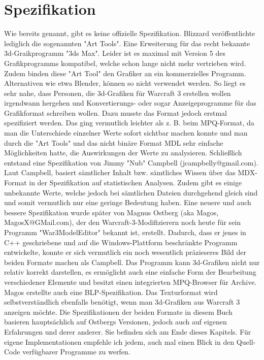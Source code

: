 \section{Spezifikation}
Wie bereits genannt, gibt es keine offizielle Spezifikation. Blizzard veröffentlichte lediglich die sogenannten "Art Tools".
Eine Erweiterung für das recht bekannte 3d-Graikprogramm "3ds Max". Leider ist es maximal mit Version 5 des Grafikprogramms kompatibel,
welche schon lange nicht mehr vertrieben wird.
Zudem binden diese "Art Tool" den Grafiker an ein kommerzielles Programm. Alternativen wie etwa Blender,
können so nicht verwendet werden.
So liegt es sehr nahe, dass Personen, die 3d-Grafiken für Warcraft 3 erstellen wollen irgendwann hergehen
und Konvertierungs- oder sogar Anzeigeprogramme für das Grafikformat schreiben wollen.
Dazu musste das Format jedoch erstmal spezifiziert werden. Das ging vermutlich leichter als z. B. beim MPQ-Format,
da man die Unterschiede einzelner Werte sofort sichtbar machen konnte und man durch die "Art Tools" und das
nicht binäre Format MDL sehr einfache Möglichkeiten hatte, die Auswirkungen der Werte zu analysieren.
Schließlich entstand eine Spezifikation von Jimmy "Nub" Campbell (jcampbelly@gmail.com).
Laut Campbell, basiert sämtlicher Inhalt bzw. sämtliches Wissen über das MDX-Format in der Spezifikation auf statistischen Analysen. Zudem gibt es einige unbekannte Werte, welche jedoch bei sämtlichen Dateien durchgehend gleich sind und somit vermutlich nur eine geringe Bedeutung haben.
Eine neuere und auch bessere Spezifikation wurde später von Magnus Ostberg (aka Magos, MagosX@GMail.com), der den Warcraft-3-Modifizierern
noch heute für sein Programm "War3ModelEditor" bekannt ist, erstellt.
Dadurch, dass er jenes in C++ geschriebene und auf die Windows-Plattform beschränkte Programm entwickelte,
konnte er sich vermutlich ein noch wesentlich präzieseres Bild der beiden Formate machen als Campbell.
Das Programm kann 3d-Grafiken nicht nur relativ korrekt darstellen, es ermöglicht auch eine einfache Form
der Bearbeitung verschiedener Elemente und besitzt einen integrierten MPQ-Browser für Archive.
Magos erstellte auch eine BLP-Spezifikation. Das Texturformat wird selbstverständlich ebenfalls benötigt,
wenn man 3d-Grafiken aus Warcraft 3 anzeigen möchte.
Die Spezifikationen der beiden Formate in diesem Buch basieren hauptsächlich auf Ostbergs Versionen, jedoch auch auf eigenen Erfahrungen und derer anderer.
Sie befinden sich am Ende dieses Kapitels.
Für eigene Implementationen empfehle ich jedem, auch mal einen Blick in den Quell-Code verfügbarer Programme
zu werfen.

